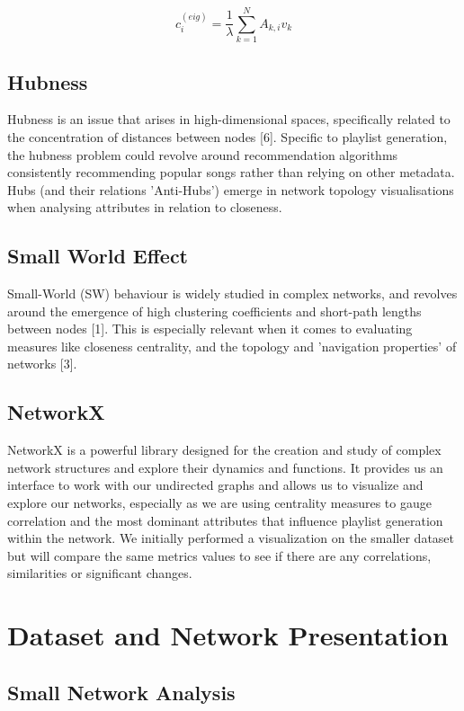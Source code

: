 \documentclass[conference]{IEEEtran}
\begin{document}
\begin{equation}
\label{}
c_i^{(eig)} = \frac{1}{\lambda}\sum_{k=1}^{N}A_{k,i}v_k
\end{equation}

\subsection{Hubness}

Hubness is an issue that arises in high-dimensional spaces, specifically related to the concentration of distances between nodes [6]. Specific to playlist generation, the hubness problem could revolve around recommendation algorithms consistently recommending popular songs rather than relying on other metadata. Hubs (and their relations 'Anti-Hubs') emerge in network topology visualisations when analysing attributes in relation to closeness.

\subsection{Small World Effect}

Small-World (SW) behaviour is widely studied in complex networks, and revolves around the emergence of high clustering coefficients and short-path lengths between nodes [1]. This is especially relevant when it comes to evaluating measures like closeness centrality, and the topology and 'navigation properties' of networks [3].

\subsection{NetworkX}
NetworkX is a powerful library designed for the creation and study of complex network structures and explore their dynamics and functions. It provides us an interface to work with our undirected graphs and allows us to visualize and explore our networks, especially as we are using centrality measures to gauge correlation and the most dominant attributes that influence playlist generation within the network. We initially performed a visualization on the smaller dataset but will compare the same metrics values to see if there are any correlations, similarities or significant changes.

\section{Dataset and Network Presentation}

\subsection{Small Network Analysis}
\end{document}
